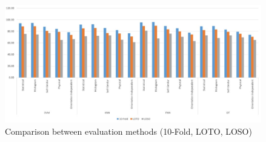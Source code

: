 \documentclass[journal,article,submit,moreauthors,pdftex]{Definitions/mdpi}
\begin{document}
 
\begin{figure}[H]
	\centering
	\includegraphics[width=14 cm]{Definitions/images/evaluation_comparison_2.jpg}
	\caption{Comparison between evaluation methods (10-Fold, LOTO, LOSO)}
	\label{fig:evaluation_comparison}
\end{figure} 
%
%
\end{document}
